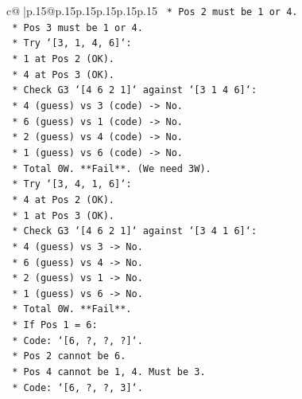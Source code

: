 \documentclass{article}
\begin{document}
{\begin{supertabular}{c@{$\;$}|p{.15\linewidth}@{}p{.15\linewidth}p{.15\linewidth}p{.15\linewidth}p{.15\linewidth}p{.15\linewidth}}
{{{\texttt{                    *   Pos 2 must be 1 or 4.} \\
\texttt{                    *   Pos 3 must be 1 or 4.} \\
\texttt{                    *   Try `{[}3, 1, 4, 6{]}`:} \\
\texttt{                        *   1 at Pos 2 (OK).} \\
\texttt{                        *   4 at Pos 3 (OK).} \\
\texttt{                        *   Check G3 `{[}4 6 2 1{]}` against `{[}3 1 4 6{]}`:} \\
\texttt{                            *   4 (guess) vs 3 (code) {-}> No.} \\
\texttt{                            *   6 (guess) vs 1 (code) {-}> No.} \\
\texttt{                            *   2 (guess) vs 4 (code) {-}> No.} \\
\texttt{                            *   1 (guess) vs 6 (code) {-}> No.} \\
\texttt{                            *   Total 0W. **Fail**. (We need 3W).} \\
\texttt{                    *   Try `{[}3, 4, 1, 6{]}`:} \\
\texttt{                        *   4 at Pos 2 (OK).} \\
\texttt{                        *   1 at Pos 3 (OK).} \\
\texttt{                        *   Check G3 `{[}4 6 2 1{]}` against `{[}3 4 1 6{]}`:} \\
\texttt{                            *   4 (guess) vs 3 {-}> No.} \\
\texttt{                            *   6 (guess) vs 4 {-}> No.} \\
\texttt{                            *   2 (guess) vs 1 {-}> No.} \\
\texttt{                            *   1 (guess) vs 6 {-}> No.} \\
\texttt{                            *   Total 0W. **Fail**.} \\
\texttt{                *   If Pos 1 = 6:} \\
\texttt{                    *   Code: `{[}6, ?, ?, ?{]}`.} \\
\texttt{                    *   Pos 2 cannot be 6.} \\
\texttt{                    *   Pos 4 cannot be 1, 4. Must be 3.} \\
\texttt{                    *   Code: `{[}6, ?, ?, 3{]}`.} \\
}}}
\end{supertabular}}
\end{document}
